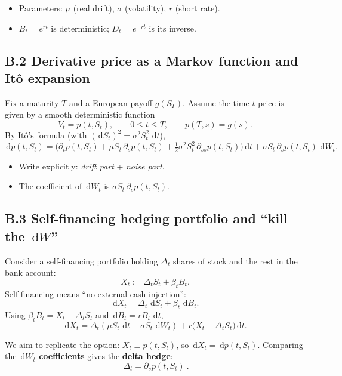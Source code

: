 \documentclass[11pt]{article}
\theoremstyle{definition}
\theoremstyle{remark}
\newcommand{\1}{\mathbf{1}}
\newcommand{\dd}{\,\mathrm{d}}
\theoremstyle{definition}
\begin{document}
\begin{itemize}[leftmargin=1.6em, itemsep=0.2em]
\item Parameters: $\mu$ (real drift), $\sigma$ (volatility), $r$ (short rate).
\item $B_t=e^{rt}$ is deterministic; $D_t=e^{-rt}$ is its inverse.
\end{itemize}

\subsection*{B.2 Derivative price as a Markov function and It\^o expansion}
Fix a maturity $T$ and a European payoff $g(S_T)$.
Assume the time-$t$ price is given by a smooth deterministic function
\[
V_t=p(t,S_t),
\qquad 0\le t\le T,
\qquad p(T,s)=g(s).
\]
By It\^o's formula (with $(\dd S_t)^2=\sigma^2 S_t^2\,\dd t$),
\[
\dd p(t,S_t)
=
\Big(\partial_t p(t,S_t)
+\mu S_t\,\partial_s p(t,S_t)
+\tfrac12\sigma^2 S_t^2\,\partial_{ss}p(t,S_t)\Big)\dd t
+\sigma S_t\,\partial_s p(t,S_t)\,\dd W_t.
\]

\begin{itemize}[leftmargin=1.6em, itemsep=0.2em]
\item Write explicitly: \emph{drift part} + \emph{noise part}.
\item The coefficient of $\dd W_t$ is $\sigma S_t\,\partial_s p(t,S_t)$.
\end{itemize}

\subsection*{B.3 Self-financing hedging portfolio and ``kill the $\dd W$''}
Consider a self-financing portfolio holding $\Delta_t$ shares of stock and the rest in the bank account:
\[
X_t := \Delta_t S_t + \beta_t B_t.
\]
Self-financing means ``no external cash injection'':
\[
\dd X_t = \Delta_t\,\dd S_t + \beta_t\,\dd B_t.
\]
Using $\beta_t B_t = X_t-\Delta_t S_t$ and $\dd B_t=rB_t\,\dd t$,
\[
\dd X_t
=
\Delta_t(\mu S_t\,\dd t+\sigma S_t\,\dd W_t)
+r\big(X_t-\Delta_t S_t\big)\dd t.
\]

We aim to replicate the option: $X_t \equiv p(t,S_t)$, so $\dd X_t=\dd p(t,S_t)$.
Comparing the \textbf{$\dd W_t$ coefficients} gives the \textbf{delta hedge}:
\[
\boxed{\ \Delta_t=\partial_s p(t,S_t)\ }.
\]
\end{document}
